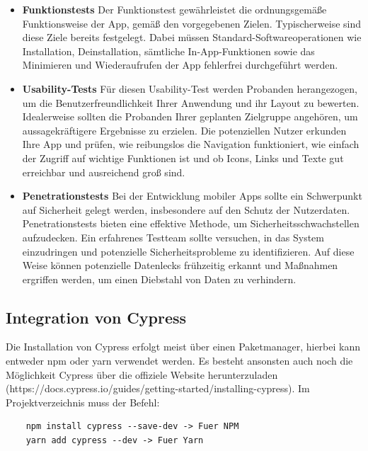 \begin{itemize}
    \item \textbf{Funktionstests}
        \newline
        Der Funktionstest gewährleistet die ordnungsgemäße Funktionsweise der App, gemäß den vorgegebenen Zielen. Typischerweise sind diese Ziele bereits festgelegt. Dabei müssen Standard-Softwareoperationen wie Installation, Deinstallation, sämtliche In-App-Funktionen sowie das Minimieren und Wiederaufrufen der App fehlerfrei durchgeführt werden.
    \item \textbf{Usability-Tests}
        \newline
        Für diesen Usability-Test werden Probanden herangezogen, um die Benutzerfreundlichkeit Ihrer Anwendung und ihr Layout zu bewerten. Idealerweise sollten die Probanden Ihrer geplanten Zielgruppe angehören, um aussagekräftigere Ergebnisse zu erzielen. Die potenziellen Nutzer erkunden Ihre App und prüfen, wie reibungslos die Navigation funktioniert, wie einfach der Zugriff auf wichtige Funktionen ist und ob Icons, Links und Texte gut erreichbar und ausreichend groß sind.
    \item \textbf{Penetrationstests}
        \newline
        Bei der Entwicklung mobiler Apps sollte ein Schwerpunkt auf Sicherheit gelegt werden, insbesondere auf den Schutz der Nutzerdaten. Penetrationstests bieten eine effektive Methode, um Sicherheitsschwachstellen aufzudecken. Ein erfahrenes Testteam sollte versuchen, in das System einzudringen und potenzielle Sicherheitsprobleme zu identifizieren. Auf diese Weise können potenzielle Datenlecks frühzeitig erkannt und Maßnahmen ergriffen werden, um einen Diebstahl von Daten zu verhindern.
\end{itemize}



\subsection{Integration von Cypress}
Die Installation von Cypress erfolgt meist über einen Paketmanager, hierbei kann entweder npm oder yarn verwendet werden. Es besteht ansonsten auch noch die Möglichkeit Cypress über die offiziele Website herunterzuladen (https://docs.cypress.io/guides/getting-started/installing-cypress).
Im Projektverzeichnis muss der Befehl:

\begin{lstlisting}
    npm install cypress --save-dev -> Fuer NPM
    yarn add cypress --dev -> Fuer Yarn
\end{lstlisting}


